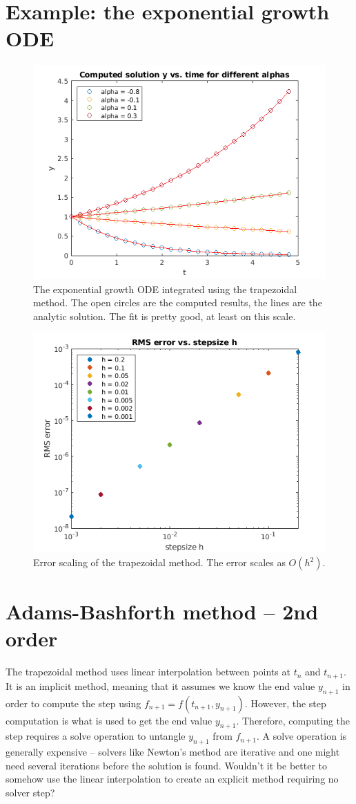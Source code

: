 \documentclass[hidelinks,notitlepage]{book}
\begin{document}
\section{Example: the exponential growth ODE}
\begin{figure}[tbh]
	\centering
	\includegraphics[width=0.60\columnwidth]{TrapezoidalExponential.png}
	\caption{The exponential growth ODE integrated using the trapezoidal method.  The open circles are the computed results, the lines are the analytic solution.  The fit is pretty good, at least on this scale.}
	\label{fig:TrapezoidalExponential}
\end{figure}
\begin{figure}[h!]
	\centering
	\includegraphics[width=0.60\columnwidth]{TrapezoidalExponentialErr.png}
	\caption{Error scaling of the trapezoidal method.  The error scales as $O(h^2)$.}
	\label{fig:TrapezoidalExponentialErr}
\end{figure}


\section{Adams-Bashforth method -- 2nd order}
The trapezoidal method uses linear interpolation between points at $t_n$ and $t_{n+1}$.  It is an implicit method, meaning that it assumes we know the end value $y_{n+1}$ in order to compute the step using $f_{n+1} = f(t_{n+1}, y_{n+1})$.  However, the step computation is what is used to get the end value $y_{n+1}$.  Therefore, computing the step requires a solve operation to untangle $y_{n+1}$ from $f_{n+1}$.  A solve operation is generally expensive -- solvers like Newton's method are iterative and one might need several iterations before the solution is found.  Wouldn't it be better to somehow use the linear interpolation to create an explicit method requiring no solver step?
\end{document}
